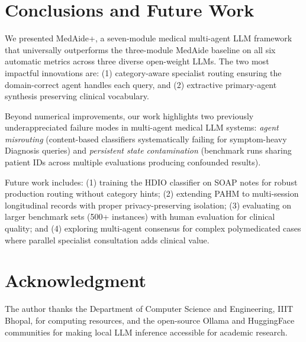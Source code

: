 \documentclass[conference]{IEEEtran}
\begin{document}
\section{Conclusions and Future Work}
\label{sec:conclusion}

We presented MedAide+, a seven-module medical multi-agent LLM framework that universally
outperforms the three-module MedAide baseline on all six automatic metrics across three
diverse open-weight LLMs. The two most impactful innovations are: (1) category-aware specialist
routing ensuring the domain-correct agent handles each query, and (2) extractive
primary-agent synthesis preserving clinical vocabulary.

Beyond numerical improvements, our work highlights two previously underappreciated
failure modes in multi-agent medical LLM systems: \emph{agent misrouting} (content-based
classifiers systematically failing for symptom-heavy Diagnosis queries) and
\emph{persistent state contamination} (benchmark runs sharing patient IDs across
multiple evaluations producing confounded results).

Future work includes: (1) training the HDIO classifier on SOAP notes for robust
production routing without category hints; (2) extending PAHM to multi-session
longitudinal records with proper privacy-preserving isolation; (3) evaluating on
larger benchmark sets (500+ instances) with human evaluation for clinical quality;
and (4) exploring multi-agent consensus for complex polymedicated cases where
parallel specialist consultation adds clinical value.

\section*{Acknowledgment}

The author thanks the Department of Computer Science and Engineering, IIIT Bhopal,
for computing resources, and the open-source Ollama and HuggingFace communities
for making local LLM inference accessible for academic research.
\end{document}
